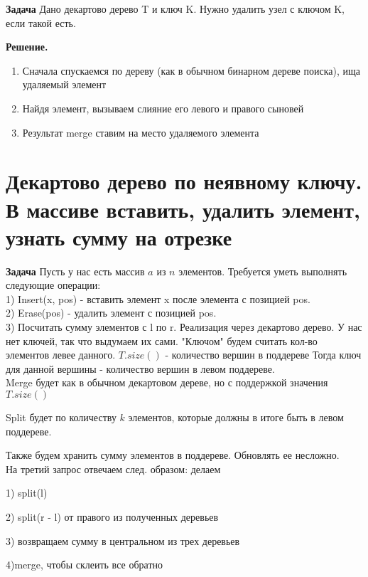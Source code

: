 \textbf{Задача} Дано декартово дерево T и ключ K. Нужно удалить узел с ключом K, если такой есть.


\textbf{Решение.}
\begin{enumerate}
    \item Сначала спускаемся по дереву (как в обычном бинарном дереве поиска), ища удаляемый элемент
    \item Найдя элемент, вызываем слияние его левого и правого сыновей
    \item Результат merge ставим на место удаляемого элемента
\end{enumerate}

\setcounter{section}{57}
\section{Декартово дерево по неявному ключу. В массиве вставить, удалить элемент, узнать сумму на отрезке}

\textbf{Задача} Пусть у нас есть массив $a$ из $n$ элементов.
Требуется уметь выполнять следующие операции: \\
1) Insert(x, pos) - вставить элемент x после элемента с позицией pos. \\
2) Erase(pos) - удалить элемент с позицией pos. \\
3) Посчитать сумму элементов с l по r.
\newline
Реализация через декартово дерево.
У нас нет ключей, так что выдумаем их сами. "Ключом" будем считать  кол-во элементов левее данного. 
$T.size()$ - количество вершин в поддереве
Тогда ключ для данной вершины - количество вершин в левом поддереве. \\

Merge будет как в обычном декартовом дереве, но с поддержкой значения $T.size()$

Split будет по количеству $k$ элементов, которые должны в итоге быть в левом поддереве.

Также будем хранить сумму элементов в поддереве. Обновлять ее несложно. \\

На третий запрос отвечаем след. образом: делаем

1) split(l)

2) split(r - l) от правого из полученных деревьев

3) возвращаем сумму в центральном из трех деревьев

4)merge, чтобы склеить все обратно